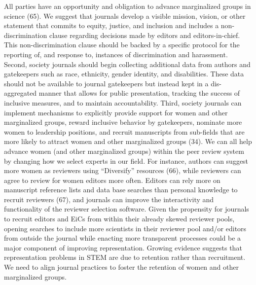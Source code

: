 \documentclass[11pt,]{article}
\begin{document}
All parties have an opportunity and obligation to advance marginalized
groups in science (65). We suggest that journals develop a visible
mission, vision, or other statement that commits to equity, justice, and
inclusion and includes a non-discrimination clause regarding decisions
made by editors and editors-in-chief. This non-discrimination clause
should be backed by a specific protocol for the reporting of, and
response to, instances of discrimination and harassment. Second, society
journals should begin collecting additional data from authors and
gatekeepers such as race, ethnicity, gender identity, and disabilities.
These data should not be available to journal gatekeepers but instead
kept in a dis-aggregated manner that allows for public presentation,
tracking the success of inclusive measures, and to maintain
accountability. Third, society journals can implement mechanisms to
explicitly provide support for women and other marginalized groups,
reward inclusive behavior by gatekeepers, nominate more women to
leadership positions, and recruit manuscripts from sub-fields that are
more likely to attract women and other marginalized groups (34). We can
all help advance women (and other marginalized groups) within the peer
review system by changing how we select experts in our field. For
instance, authors can suggest more women as reviewers using
``Diversify'' resources (66), while reviewers can agree to review for
women editors more often. Editors can rely more on manuscript reference
lists and data base searches than personal knowledge to recruit
reviewers (67), and journals can improve the interactivity and
functionality of the reviewer selection software. Given the propensity
for journals to recruit editors and EiCs from within their already
skewed reviewer pools, opening searches to include more scientists in
their reviewer pool and/or editors from outside the journal while
enacting more transparent processes could be a major component of
improving representation. Growing evidence suggests that representation
problems in STEM are due to retention rather than recruitment. We need
to align journal practices to foster the retention of women and other
marginalized groups.
\end{document}

